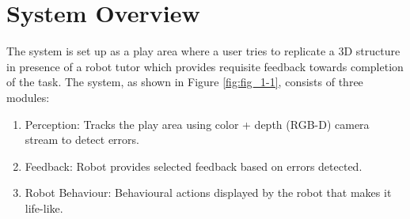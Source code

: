 \chapter{System Overview}
\label{chap:three}
The system is set up as a play area where a user tries to replicate a 3D structure in presence of a robot tutor which provides requisite feedback towards completion of the task. The system, as shown in Figure \ref{fig:fig_1-1}, consists of three modules:
\begin{enumerate}
    \item Perception: Tracks the play area using color + depth (RGB-D) camera stream to detect errors.
    \item Feedback: Robot provides selected feedback based on errors detected. 
    \item Robot Behaviour: Behavioural actions displayed by the robot that makes it life-like. 
\end{enumerate}

